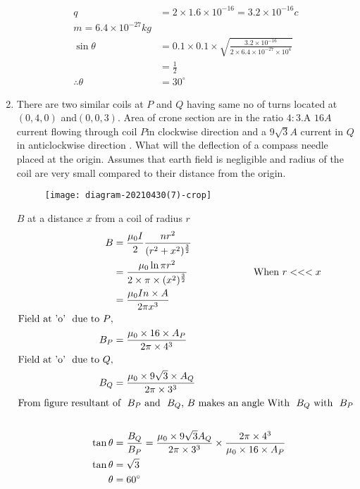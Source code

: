 \begin{enumerate}[ label=\color{ocre}\textbf{\arabic*.}]
\begin{answer}
\begin{align*}
		q&=2\times1.6\times10^{-16}=3.2\times10^{-16}c\\
		m=6.4\times10^{-27}kg\\
		\sin\theta&=0.1\times0.1\times\sqrt{\frac{3.2\times10^{-16}}{2\times6.4\times10^{-27}\times10^4}}\\
		&=\frac{1}{2}\\
		\therefore\theta&=30^\circ
		\end{align*}
	\end{answer}
	\item There are two similar coils at $P$ and $Q$ having same no of turns located at $(0,4,0)$ and$(0,0,3)$. Area of crone section are in the ratio $4:3$.A $16 A$ current flowing through coil $P$in clockwise direction and a $9\sqrt{3} A$ current in $Q$ in anticlockwise direction . What will the deflection of a compass needle placed at the origin. Assumes that earth field is negligible and radius of the coil are very small compared to their distance from the origin.
	\begin{figure}[H]
		\begin{center}
			\texttt{[image: diagram-20210430(7)-crop]}
		\end{center}
	\end{figure}
	\begin{answer}
		$B$ at a distance $x$ from a coil of radius $r$\\
		\begin{align*}
		B&=\frac{\mu_0I}{2}\frac{nr^2}{(r^2+x^2)^\frac{3}{2}}\\
		&=\frac{\mu_0 \ln \pi r^2}{2\times\pi \times(x^2)^\frac{3}{2}}\hspace{2cm}\quad \text{When}\ r<<<x\\
		&=\frac{\mu_0In\times A}{2\pi x^3}\\
		\text{Field at 'o' \ due to $P$},\\
		B_P&=\frac{\mu_0\times16\times A_P}{2\pi\times4^3}\\
		\text{Field at 'o' \ due to $Q$},\\
		B_Q&=\frac{\mu_0\times9\sqrt{3}\times A_Q}{2\pi\times3^3}\\
		\intertext{From figure resultant of \ $B_P$\ and \ $B_Q$,\ $B$ makes an angle With \ $B_Q$\ with \ $B_P$}\\
		\tan\theta&=\frac{B_Q}{B_P}
		=\frac{\mu_0\times9\sqrt{3} A_Q}{2\pi\times3^3}\times\frac{2\pi\times4^3}{\mu_0\times16\times A_P}\\
		\tan\theta&=\sqrt{3}\\
		\theta&=60^\circ
		\end{align*}
	\end{answer}
\end{enumerate}